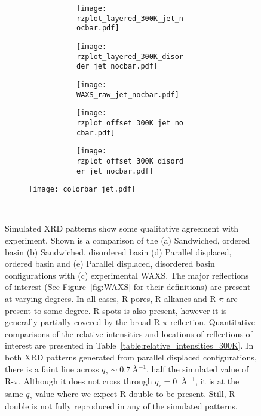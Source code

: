   \begin{figure}[!htb]
	\centering
	\begin{subfigure}{0.905\textwidth}
	\begin{subfigure}{0.28\linewidth}
			\begin{subfigure}{\textwidth}
			\centering
		        	\texttt{[image: rzplot\_layered\_300K\_jet\_nocbar.pdf]}
			\end{subfigure}
			\begin{subfigure}{\textwidth}
		       		\centering
	        		\texttt{[image: rzplot\_layered\_300K\_disorder\_jet\_nocbar.pdf]}
			\end{subfigure}
	\end{subfigure}
	\begin{subfigure}{0.4\linewidth}
	\centering
			\begin{subfigure}{\textwidth}
		       		\centering
	        		\texttt{[image: WAXS\_raw\_jet\_nocbar.pdf]}
			\end{subfigure}
	\end{subfigure}
	\begin{subfigure}{0.28\linewidth}
	\centering
			\begin{subfigure}{\textwidth}
			\centering
		        	\texttt{[image: rzplot\_offset\_300K\_jet\_nocbar.pdf]}
			\end{subfigure}
			
			\begin{subfigure}{\textwidth}
				\centering
			    \texttt{[image: rzplot\_offset\_300K\_disorder\_jet\_nocbar.pdf]}
			\end{subfigure}
	\end{subfigure}
	\end{subfigure}
	\begin{subfigure}{0.085\textwidth}
		\centering
		\texttt{[image: colorbar\_jet.pdf]}
	\end{subfigure}	
	\caption{Simulated XRD patterns show some qualitative agreement with
		experiment. Shown is a comparison of the (a) Sandwiched, ordered basin (b)
		Sandwiched, disordered basin (d) Parallel displaced, ordered basin and (e)
		Parallel displaced, disordered basin configurations with (c) experimental WAXS.
		The major reflections of interest (See Figure~\ref{fig:WAXS} for their
		definitions) are present at varying degrees. In all cases, R-pores, R-alkanes
		and R-$\pi$ are present to some degree. R-spots is also present, however it is
		generally partially covered by the broad R-$\pi$ reflection. Quantitative
		comparisons of the relative intensities and locations of reflections of
		interest are presented in Table~\ref{table:relative_intensities_300K}. In both
		XRD patterns generated from parallel displaced configurations, there is a faint line
		across $q_z \sim 0.7~$\AA$^{-1}$, half the simulated value of R-$\pi$. Although
		it does not cross through $q_r = 0$~\AA$^{-1}$, it is at the same $q_z$ value
		where we expect R-double to be present. Still, R-double is not fully reproduced
		in any of the simulated patterns.}~\label{fig:XRDsim} 
  \end{figure}
  

